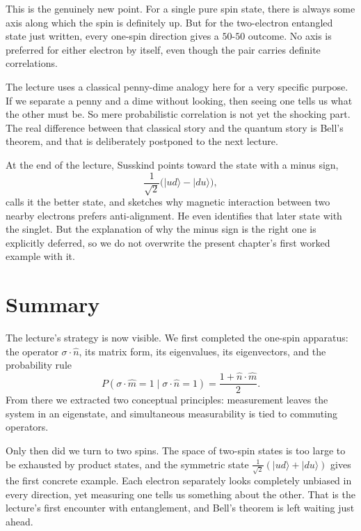 This is the genuinely new point. For a single pure spin state, there is always some axis along which the spin is definitely up. But for the two-electron entangled state just written, every one-spin direction gives a \(50\)-\(50\) outcome. No axis is preferred for either electron by itself, even though the pair carries definite correlations.

\begin{remark}
The lecture uses a classical penny-dime analogy here for a very specific purpose. If we separate a penny and a dime without looking, then seeing one tells us what the other must be. So mere probabilistic correlation is not yet the shocking part. The real difference between that classical story and the quantum story is Bell's theorem, and that is deliberately postponed to the next lecture.
\end{remark}

At the end of the lecture, Susskind points toward the state with a minus sign,
\begin{equation}
\frac{1}{\sqrt2}\bigl(|ud\rangle-|du\rangle\bigr),
\end{equation}
calls it the better state, and sketches why magnetic interaction between two nearby electrons prefers anti-alignment. He even identifies that later state with the singlet. But the explanation of why the minus sign is the right one is explicitly deferred, so we do not overwrite the present chapter's first worked example with it.

\section{Summary}

The lecture's strategy is now visible. We first completed the one-spin apparatus: the operator \(\sigma\cdot\hat n\), its matrix form, its eigenvalues, its eigenvectors, and the probability rule
\begin{equation}
P(\sigma\cdot\hat m=1 \mid \sigma\cdot\hat n=1)=\frac{1+\hat n\cdot\hat m}{2}.
\end{equation}
From there we extracted two conceptual principles: measurement leaves the system in an eigenstate, and simultaneous measurability is tied to commuting operators.

Only then did we turn to two spins. The space of two-spin states is too large to be exhausted by product states, and the symmetric state \(\frac{1}{\sqrt2}(|ud\rangle+|du\rangle)\) gives the first concrete example. Each electron separately looks completely unbiased in every direction, yet measuring one tells us something about the other. That is the lecture's first encounter with entanglement, and Bell's theorem is left waiting just ahead.